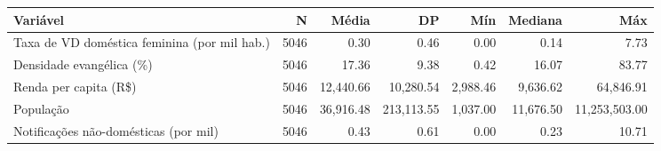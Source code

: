 \begin{tabular}{lrrrrrr}
\toprule
Variável & N & Média & DP & Mín & Mediana & Máx \\
\midrule
Taxa de VD doméstica feminina (por mil hab.) & 5046 & 0.30 & 0.46 & 0.00 & 0.14 & 7.73 \\
Densidade evangélica (\%) & 5046 & 17.36 & 9.38 & 0.42 & 16.07 & 83.77 \\
Renda per capita (R\$) & 5046 & 12,440.66 & 10,280.54 & 2,988.46 & 9,636.62 & 64,846.91 \\
População & 5046 & 36,916.48 & 213,113.55 & 1,037.00 & 11,676.50 & 11,253,503.00 \\
Notificações não-domésticas (por mil) & 5046 & 0.43 & 0.61 & 0.00 & 0.23 & 10.71 \\
\bottomrule
\end{tabular}
